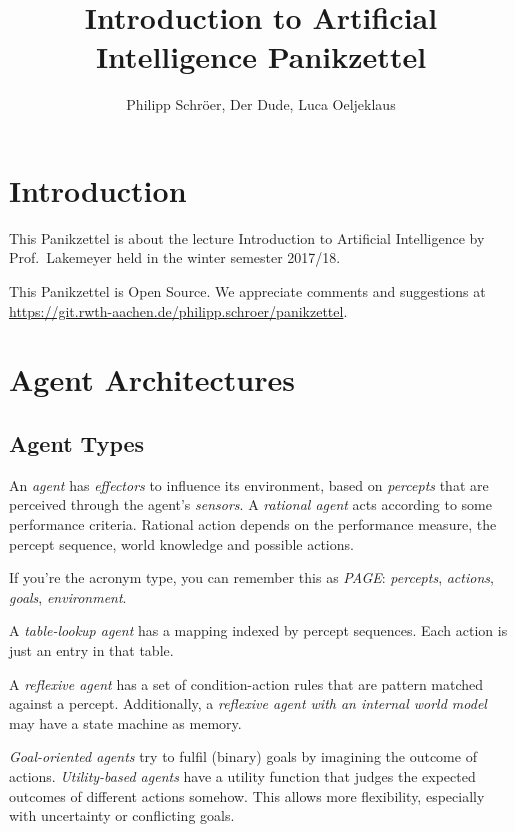 \documentclass[english]{panikzettel}
\title{Introduction to Artificial Intelligence Panikzettel}
\author{Philipp Schröer, Der Dude, Luca Oeljeklaus}
\begin{document}
\maketitle

\tableofcontents

\section{Introduction}

This Panikzettel is about the lecture Introduction to Artificial Intelligence by Prof.\ Lakemeyer held in the winter semester 2017/18.

This Panikzettel is Open Source. We appreciate comments and suggestions at \\ \url{https://git.rwth-aachen.de/philipp.schroer/panikzettel}.

\section{Agent Architectures}

\subsection{Agent Types}

An \emph{agent} has \emph{effectors} to influence its environment, based on \emph{percepts} that are perceived  through the agent's \emph{sensors}.
A \emph{rational agent} acts according to some performance criteria.
Rational action depends on the performance measure, the percept sequence, world knowledge and possible actions.

If you're the acronym type, you can remember this as \emph{PAGE}: \emph{percepts}, \emph{actions}, \emph{goals}, \emph{environment}.

A \emph{table-lookup agent} has a mapping indexed by percept sequences.
Each action is just an entry in that table.

A \emph{reflexive agent} has a set of condition-action rules that are pattern matched against a percept.
Additionally, a \emph{reflexive agent with an internal world model} may have a state machine as memory.

\emph{Goal-oriented agents} try to fulfil (binary) goals by imagining the outcome of actions.
\emph{Utility-based agents} have a utility function that judges the expected outcomes of different actions somehow.
This allows more flexibility, especially with uncertainty or conflicting goals.
\end{document}
